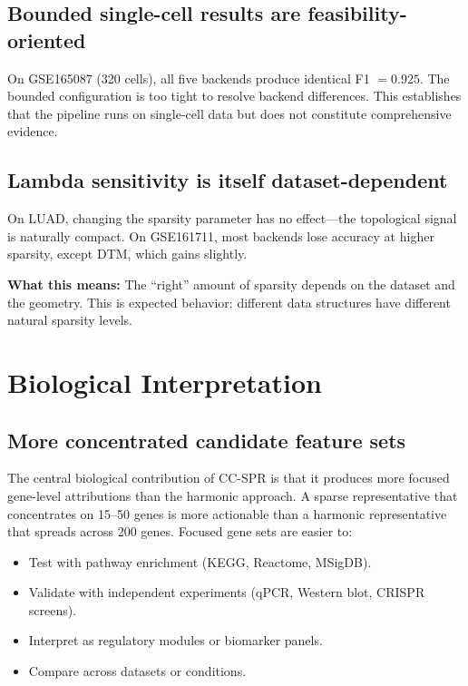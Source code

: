 \documentclass[11pt]{article}
\begin{document}
\subsection{Bounded single-cell results are feasibility-oriented}

On GSE165087 (320 cells), all five backends produce identical F1 $= 0.925$.
The bounded configuration is too tight to resolve backend differences.
This establishes that the pipeline runs on single-cell data but does not constitute comprehensive evidence.

\subsection{Lambda sensitivity is itself dataset-dependent}

On LUAD, changing the sparsity parameter has no effect---the topological signal is naturally compact.
On GSE161711, most backends lose accuracy at higher sparsity, except DTM, which gains slightly.

\textbf{What this means:} The ``right'' amount of sparsity depends on the dataset and the geometry.
This is expected behavior: different data structures have different natural sparsity levels.

\section{Biological Interpretation}
\label{sec:biology}

\subsection{More concentrated candidate feature sets}

The central biological contribution of CC-SPR is that it produces more focused gene-level attributions than the harmonic approach.
A sparse representative that concentrates on 15--50 genes is more actionable than a harmonic representative that spreads across 200 genes.
Focused gene sets are easier to:
\begin{itemize}[leftmargin=1.5em]
\item Test with pathway enrichment (KEGG, Reactome, MSigDB).
\item Validate with independent experiments (qPCR, Western blot, CRISPR screens).
\item Interpret as regulatory modules or biomarker panels.
\item Compare across datasets or conditions.
\end{itemize}
\end{document}
